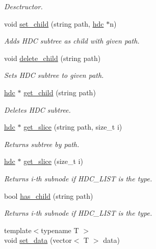 \begin{DoxyCompactItemize}
\begin{DoxyCompactList}\small\item\em Desctructor. \end{DoxyCompactList}\item 
void \hyperlink{a00003_acde60e58222d3b7d2b2a53b14289f500}{set\+\_\+child} (string path, \hyperlink{a00003}{hdc} $\ast$n)
\begin{DoxyCompactList}\small\item\em Adds H\+DC subtree as child with given path. \end{DoxyCompactList}\item 
void \hyperlink{a00003_af2b7f95b9cf36d26e0fc20dd1c0465ba}{delete\+\_\+child} (string path)
\begin{DoxyCompactList}\small\item\em Sets H\+DC subtree to given path. \end{DoxyCompactList}\item 
\hyperlink{a00003}{hdc} $\ast$ \hyperlink{a00003_aafcd7c001cf4d3e2d61dbbf6efef6e08}{get\+\_\+child} (string path)
\begin{DoxyCompactList}\small\item\em Deletes H\+DC subtree. \end{DoxyCompactList}\item 
\hyperlink{a00003}{hdc} $\ast$ \hyperlink{a00003_a580b1c84ebb50da63e2682ddceb6010a}{get\+\_\+slice} (string path, size\+\_\+t i)
\begin{DoxyCompactList}\small\item\em Returns subtree by path. \end{DoxyCompactList}\item 
\hyperlink{a00003}{hdc} $\ast$ \hyperlink{a00003_a1ef96265e222ef9acc07c151b20af8bf}{get\+\_\+slice} (size\+\_\+t i)
\begin{DoxyCompactList}\small\item\em Returns i-\/th subnode if H\+D\+C\+\_\+\+L\+I\+ST is the type. \end{DoxyCompactList}\item 
bool \hyperlink{a00003_aee70cadad065fa643d8313e068734e59}{has\+\_\+child} (string path)
\begin{DoxyCompactList}\small\item\em Returns i-\/th subnode if H\+D\+C\+\_\+\+L\+I\+ST is the type. \end{DoxyCompactList}\item 
{\footnotesize template$<$typename T $>$ }\\void \hyperlink{a00003_a120de413f9264db573e7c54aa49ae489}{set\+\_\+data} (vector$<$ T $>$ data)

\end{DoxyCompactItemize}
